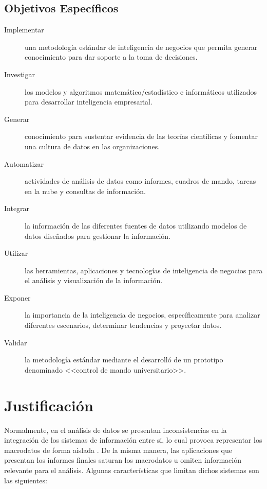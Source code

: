 \documentclass[11pt,titlepage]{report}
\begin{document}
\subsection{Objetivos Específicos}
\begin{multicols}{2}
\begin{description}

\item[Implementar] una metodología estándar de inteligencia de negocios que permita generar conocimiento para dar soporte a la toma de decisiones.

\item[Investigar] los modelos y algoritmos matemático/estadístico e informáticos utilizados para desarrollar inteligencia empresarial.

\item[Generar] conocimiento para sustentar evidencia de las teorías científicas y fomentar una cultura de datos en las organizaciones.
	
\item[Automatizar] actividades de análisis de datos como informes, cuadros de mando, tareas en la nube y consultas de información.

\item[Integrar] la información de las diferentes fuentes de datos utilizando modelos de datos diseñados para gestionar la información.

\item[Utilizar] las herramientas, aplicaciones y tecnologías de inteligencia de negocios para el análisis y visualización de la información.

\item[Exponer] la importancia de la inteligencia de negocios, específicamente para analizar diferentes escenarios, determinar tendencias y proyectar datos.

\item[Validar] la metodología estándar mediante el desarrolló de un prototipo denominado <<control de mando universitario>>.
\end{description}
\end{multicols}



\section{Justificación}

Normalmente, en el análisis de datos se presentan inconsistencias en la integración de los sistemas de información entre si, lo cual provoca representar los macrodatos de forma aislada \cite{gui01}. De la misma manera, las aplicaciones que presentan los informes finales saturan los macrodatos u omiten información relevante para el análisis. Algunas características que limitan dichos sistemas son las siguientes:
\end{document}
